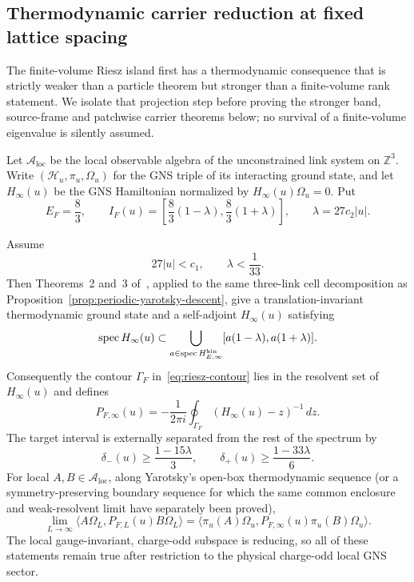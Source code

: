 
\subsection{Thermodynamic carrier reduction at fixed lattice spacing}
\label{sec:g18-thermodynamic-reduction}

The finite-volume Riesz island first has a thermodynamic consequence that is
strictly weaker than a particle theorem but stronger than a finite-volume rank
statement.  We isolate that projection step before proving the stronger band,
source-frame and patchwise carrier theorems below; no survival of a
finite-volume eigenvalue is silently assumed.

Let $\mathcal A_{\mathrm{loc}}$ be the local observable algebra of the
unconstrained link system on $\mathbb Z^3$.  Write
$(\mathcal H_u,\pi_u,\Omega_u)$ for the GNS triple of its interacting
ground state, and let $H_\infty(u)$ be the GNS Hamiltonian normalized by
$H_\infty(u)\Omega_u=0$.  Put
\[
 E_F=\frac83,\qquad
 I_F(u)=\left[\frac83(1-\lambda),\frac83(1+\lambda)\right],
 \qquad \lambda=27c_2|u| .
\]

\begin{proposition}
\label{prop:g18-infinite-riesz}
Assume
\[
 27|u|<c_1,\qquad \lambda<\frac1{33}.
\]
Then Theorems~2 and~3 of~\cite{Yarotsky2004QP}, applied to the same
three-link cell decomposition as Proposition~\ref{prop:periodic-yarotsky-descent},
give a translation-invariant thermodynamic ground state and a self-adjoint
$H_\infty(u)$ satisfying
\begin{equation}
 \operatorname{spec}H_\infty(u)
 \subset
 \bigcup_{a\in\operatorname{spec}H_{E,\infty}^{\rm kin}}
 [a(1-\lambda),a(1+\lambda)] .
 \label{eq:g18-infinite-enclosure}
\end{equation}
Consequently the contour $\Gamma_F$ in~\eqref{eq:riesz-contour} lies in the
resolvent set of $H_\infty(u)$ and defines
\begin{equation}
 P_{F,\infty}(u)
 =-\frac1{2\pi i}\oint_{\Gamma_F}
       (H_\infty(u)-z)^{-1}\,dz .
 \label{eq:g18-infinite-projection}
\end{equation}
The target interval is externally separated from the rest of the spectrum
by
\[
 \delta_-(u)\ge\frac{1-15\lambda}{3},\qquad
 \delta_+(u)\ge\frac{1-33\lambda}{6}.
\]
For local $A,B\in\mathcal A_{\mathrm{loc}}$, along Yarotsky's open-box
thermodynamic sequence (or a symmetry-preserving boundary sequence for which
the same common enclosure and weak-resolvent limit have separately been
proved),
\begin{equation}
 \lim_{L\to\infty}
 \langle A\Omega_L,P_{F,L}(u)B\Omega_L\rangle
 =
 \langle \pi_u(A)\Omega_u,
 P_{F,\infty}(u)\pi_u(B)\Omega_u\rangle .
 \label{eq:g18-projection-limit}
\end{equation}
The local gauge-invariant, charge-odd subspace is reducing, so all of these
statements remain true after restriction to the physical charge-odd local
GNS sector.
\end{proposition}

